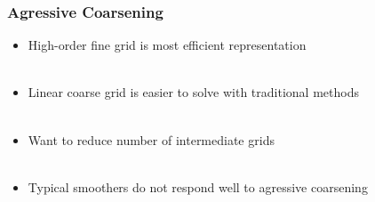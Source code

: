 \documentclass{beamer}
\begin{document}

\begin{frame}
\begin{center}
\frametitle{Agressive Coarsening}

\begin{itemize}

\item High-order fine grid is most efficient representation\\

~\\

\item Linear coarse grid is easier to solve with traditional methods\\

~\\

\item Want to reduce number of intermediate grids\\

~\\

\item Typical smoothers do not respond well to agressive coarsening\\

\end{itemize}

\end{center}
\end{frame}

\end{document}
